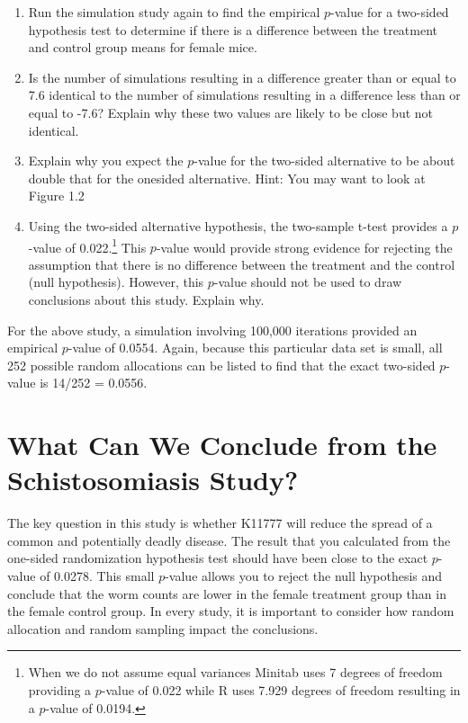 \documentclass[
]{report}
\begin{document}
\begin{enumerate}
\def\labelenumi{\arabic{enumi}.}
\setcounter{enumi}{12}
\item
  Run the simulation study again to find the empirical \(p\)-value for a two-sided hypothesis test to determine if there is a difference between the treatment and control group means for female mice.
\item
  Is the number of simulations resulting in a difference greater than or equal to 7.6 identical to the number of simulations resulting in a difference less than or equal to -7.6? Explain why these two values are likely to be close but not identical.
\item
  Explain why you expect the \(p\)-value for the two-sided alternative to be about double that for the onesided alternative. Hint: You may want to look at Figure 1.2
\item
  Using the two-sided alternative hypothesis, the two-sample t-test provides a \(p\)-value of 0.022.\footnote{When we do not assume equal variances Minitab uses 7 degrees of freedom providing a \(p\)-value of 0.022 while R uses 7.929 degrees of freedom resulting in a \(p\)-value of 0.0194.} This \(p\)-value would provide strong evidence for rejecting the assumption that there is no difference between the treatment and the control (null hypothesis). However, this \(p\)-value should not be used to draw conclusions about this study. Explain why.
\end{enumerate}

For the above study, a simulation involving 100,000 iterations provided an empirical \(p\)-value of 0.0554. Again, because this particular data set is small, all 252 possible random allocations can be listed to find that the exact two-sided \(p\)-value is 14/252 = 0.0556.

\hypertarget{what-can-we-conclude-from-the-schistosomiasis-study}{%
\section{\texorpdfstring{\textbf{What Can We Conclude from the Schistosomiasis Study?}}{What Can We Conclude from the Schistosomiasis Study?}}\label{what-can-we-conclude-from-the-schistosomiasis-study}}

The key question in this study is whether K11777 will reduce the spread of a common and potentially deadly disease. The result that you calculated from the one-sided randomization hypothesis test should have been close to the exact \(p\)-value of 0.0278. This small \(p\)-value allows you to reject the null hypothesis and conclude that the worm counts are lower in the female treatment group than in the female control group. In every study, it is important to consider how random allocation and random sampling impact the conclusions.
\end{document}
